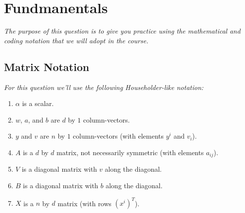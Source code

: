 \section{Fundmanentals}

\textit{The purpose of this question is to give you practice using the mathematical and coding notation that we will adopt in the course.}

\subsection{Matrix Notation}

\textit{For this question we'll use the following Householder-like notation:}
\begin{enumerate}
	\item $\alpha$ is a scalar.
	\item $w$, $a$, and $b$ are $d$ by $1$ column-vectors.
	\item $y$ and $v$ are $n$ by $1$ column-vectors (with elements $y^i$ and $v_i$).
	\item $A$ is a $d$ by $d$ matrix, not necessarily symmetric (with elements $a_{ij}$).
	\item $V$ is a diagonal matrix with $v$ along the diagonal.
	\item $B$ is a diagonal matrix with $b$ along the diagonal.
	\item $X$ is a $n$ by $d$ matrix (with rows $(x^i)^T$).
\end{enumerate}



